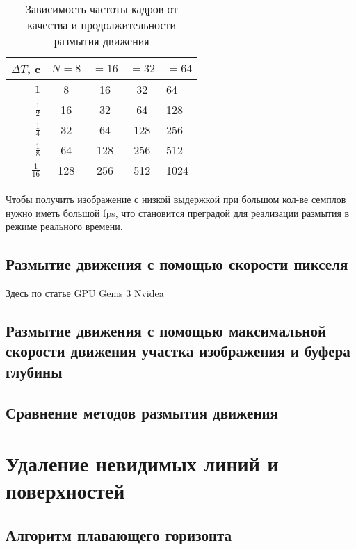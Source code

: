 \begin{table}[ht]
    \caption{Зависимость частоты кадров от качества и продолжительности размытия движения}
    \begin{tabular}{|r|c|c|c|l|}
        \hline
        $\Delta T$, c  & $N =8$ & $=16$ & $=32$ & $=64$ \\
        \hline
        $1$            & 8      & 16    & 32    & 64    \\
        $\frac{1}{2}$  & 16     & 32    & 64    & 128   \\
        $\frac{1}{4}$  & 32     & 64    & 128   & 256   \\
        $\frac{1}{8}$  & 64     & 128   & 256   & 512   \\
        $\frac{1}{16}$ & 128    & 256   & 512   & 1024  \\
        \hline
    \end{tabular}
    \label{tab:tabular}
\end{table}


Чтобы получить изображение с низкой выдержкой при большом кол-ве семплов нужно иметь большой fps, что становится преградой для реализации размытия в режиме реального времени.

\subsection{Размытие движения с помощью скорости пикселя}

Здесь по статье GPU Gems 3 Nvidea

\subsection{Размытие движения с помощью максимальной скорости движения участка изображения и буфера глубины}

\subsection{Сравнение методов размытия движения}




\section{Удаление невидимых линий и поверхностей}

\subsection{Алгоритм плавающего горизонта}

